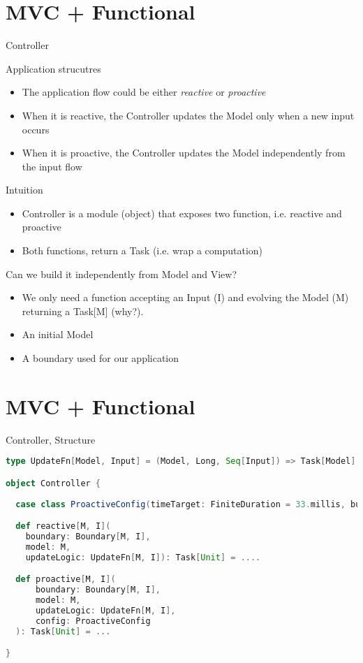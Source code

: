 \documentclass[presentation]{beamer}
\begin{document}
\section{MVC + Functional}
\begin{frame}[fragile]{Controller}

\begin{block}{Application strucutres}
  \begin{itemize}
    \item The application flow could be either \emph{reactive} or \emph{proactive}
    \item When it is reactive, the Controller updates the Model only when a new input occurs
    \item When it is proactive, the Controller updates the Model independently from the input flow
  \end{itemize}
\end{block}

\begin{block}{Intuition}
\begin{itemize}
  \item Controller is a module (object) that exposes two function, i.e. reactive and proactive
  \item Both functions, return a Task (i.e. wrap a computation)
\end{itemize}
\end{block}
\begin{block}{Can we build it independently from Model and View?}
  \begin{itemize}
    \item We only need a function accepting an Input (I) and evolving the Model (M) returning a Task[M] (why?).
    \item An initial Model
    \item A boundary used for our application
  \end{itemize}
\end{block}

\end{frame}


\section{MVC + Functional}
\begin{frame}[fragile]{Controller, Structure}
\begin{lstlisting}[language=Scala]
type UpdateFn[Model, Input] = (Model, Long, Seq[Input]) => Task[Model]

object Controller {
  
  case class ProactiveConfig(timeTarget: FiniteDuration = 33.millis, bufferSize: Int = 5)

  def reactive[M, I](
    boundary: Boundary[M, I], 
    model: M, 
    updateLogic: UpdateFn[M, I]): Task[Unit] = ....

  def proactive[M, I](
      boundary: Boundary[M, I],
      model: M,
      updateLogic: UpdateFn[M, I],
      config: ProactiveConfig
  ): Task[Unit] = ...

}
\end{lstlisting}
\end{frame}
\end{document}
